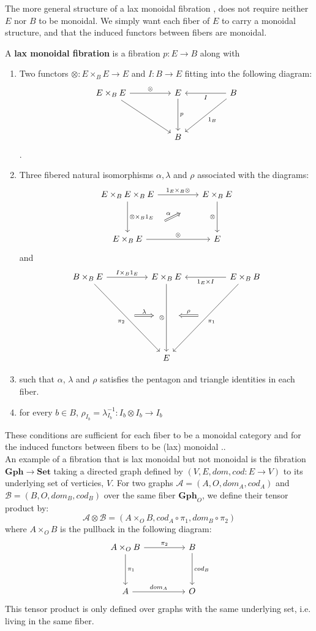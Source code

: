 The more general structure of a lax monoidal fibration \cite{zawadowski}, does not require neither $E$ nor $B$ to be monoidal. We simply want each fiber of $E$ to carry a monoidal structure, and that the induced functors between fibers are monoidal.
\begin{defn}
A \textbf{lax monoidal fibration} is a fibration $p : E \to B$ along with
\begin{enumerate}
\item Two functors $\otimes : E \times_{B} E \to E$ and $I : B \to E$ fitting into the following diagram:
\[
\ti
E \times_{B} E \ar[r, "\otimes"] \ar[rd] & E \ar[d, "p"] & B \ar[l, "I"] \ar[ld, "1_B"] \\
& B &
\kz
\].
\item Three fibered natural isomorphisms $\alpha, \lambda$ and $\rho$ associated with the diagrams:
\[
\ti
E \times_B E \times_B E \ar[r, "1_E \times_B \otimes"] \ar[d, "\otimes \times_B 1_E"] & E \times_B E \ar[d, "\otimes", swap] \\
E \times_B E \ar[r, "\otimes"] \ar[ru, "\alpha", Rightarrow, shorten <=30pt,shorten >=30pt]  & E
\kz
\]
and
\[
\ti
B \times_B E \ar[r, "I \times_B 1_{E}"] \ar[rdd, "\pi_2",swap] & E \times_B E  \ar[dd, "\otimes",swap] & E \times_B B \ar[ldd, "\pi_1"] \ar[l, "1_E \times I"] \\
\ar[r, "\lambda", xshift=20 pt, Rightarrow, shorten <=30pt, shorten >=30pt] & {}& \ar[l, "\rho", Rightarrow, xshift=-20pt, shorten <=30pt, shorten >=30pt,swap] \\
  & E &  
\kz
\]
\item such that $\alpha$, $\lambda$ and $\rho$ satisfies the pentagon and triangle identities in each fiber.
\item for every $b \in B$, $\rho_{I_b} = \lambda^{-1}_{I_b} : I_b \otimes I_b \to I_b$
\end{enumerate}
\end{defn}
These conditions are sufficient for each fiber to be a monoidal category and for the induced functors between fibers to be (lax) monoidal \cite{zawadowski}..\\
An example of a fibration that is lax monoidal but not monoidal is the fibration $\mathbf{Gph} \to \mathbf{Set}$ taking a directed graph defined by $(V, E, dom, cod : E \to V)$ to its underlying set of verticies, $V$. For two graphs $\mathcal{A}= (A, O, dom_A, cod_A)$ and $\mathcal{B} = (B, O, dom_B, cod_B)$ over the same fiber $\mathbf{Gph}_O$, we define their tensor product by:
\[
  \mathcal{A} \otimes \mathcal{B} = (A \times_O B, cod_A \circ \pi_1, dom_B \circ \pi_2)
\]
where $A \times_O B$ is the pullback in the following diagram:
\[
  \ti
  A \times_O B \ar[r, "\pi_2"] \ar[d, "\pi_1"] & B \ar[d, "cod_B"]\\
  A \ar[r, "dom_A"] & O
  \kz
\]
This tensor product is only defined over graphs with the same underlying set, i.e. living in the same fiber. 